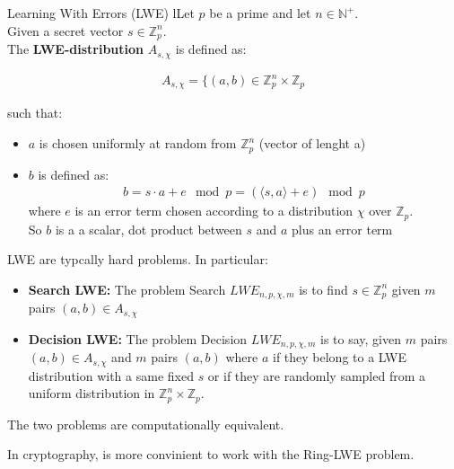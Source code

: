 \begin{defBox}{Learning With Errors (LWE)}
 lLet $p$ be a prime and let $n \in \mathbb{N}^+$.\\
 Given a secret vector $s \in \mathbb{Z}_p^n$.\\
 The \textbf{LWE-distribution} $A_{s, \chi}$ is defined as:

 \begin{align*}
    A_{s, \chi} = \{(a, b) \in \mathbb{Z}_p^n \times \mathbb{Z}_p
 \end{align*}

\noindent
such that: 
\begin{itemize}
    \item $a$ is chosen uniformly at random from $\mathbb{Z}_p^n$ (vector of lenght a)
    \item $b$ is defined as:
    \begin{align*}
        b= s \cdot a + e \mod p = (\langle s, a \rangle + e) \mod p
    \end{align*}
    where $e$ is an error term chosen according to a distribution $\chi$ over $\mathbb{Z}_p$.\\
    So $b$ is a a scalar, dot product between $s$ and $a$ plus an error term
\end{itemize}
\end{defBox}
\medskip

\noindent
LWE are typcally hard problems. In particular:
\begin{itemize}
    \item \textbf{Search LWE:} The problem Search $LWE_{n, p, \chi, m}$ is to find $s \in \mathbb{Z}_p^n$ given $m$ pairs $(a, b) \in A_{s, \chi}$
    \item \textbf{Decision LWE:} The problem Decision $LWE_{n, p, \chi, m}$ is to say, given $m$ pairs $(a, b) \in A_{s, \chi}$ and $m$ pairs $(a, b)$ where $a$ if they belong to a LWE distribution with a same fixed $s$ or if they are randomly sampled from a uniform distribution in $\mathbb{Z}_p^n \times \mathbb{Z}_p$.
\end{itemize}
\noindent
The two problems are computationally equivalent.
\bigskip

\noindent
In cryptography, is more convinient to work with the Ring-LWE problem.

